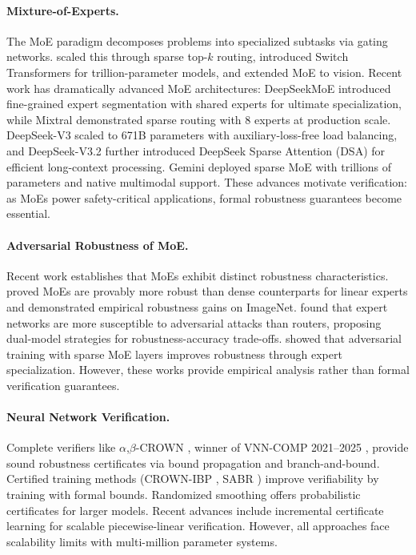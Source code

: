 \documentclass{article}
\theoremstyle{plain}
\theoremstyle{remark}
\begin{document}
\paragraph{Mixture-of-Experts.} The MoE paradigm \citep{jacobs1991} decomposes problems into specialized subtasks via gating networks. \citet{shazeer2017} scaled this through sparse top-$k$ routing, \citet{fedus2022} introduced Switch Transformers for trillion-parameter models, and \citet{riquelme2021} extended MoE to vision. Recent work has dramatically advanced MoE architectures: DeepSeekMoE \citep{dai2024} introduced fine-grained expert segmentation with shared experts for ultimate specialization, while Mixtral \citep{jiang2024} demonstrated sparse routing with 8 experts at production scale. DeepSeek-V3 \citep{deepseek2024} scaled to 671B parameters with auxiliary-loss-free load balancing, and DeepSeek-V3.2 \citep{deepseek2025v32} further introduced DeepSeek Sparse Attention (DSA) for efficient long-context processing. Gemini \citep{team2024gemini} deployed sparse MoE with trillions of parameters and native multimodal support. These advances motivate verification: as MoEs power safety-critical applications, formal robustness guarantees become essential.

\paragraph{Adversarial Robustness of MoE.} Recent work establishes that MoEs exhibit distinct robustness characteristics. \citet{puigcerver2022} proved MoEs are provably more robust than dense counterparts for linear experts and demonstrated empirical robustness gains on ImageNet. \citet{zhang2025moe} found that expert networks are more susceptible to adversarial attacks than routers, proposing dual-model strategies for robustness-accuracy trade-offs. \citet{pavlitska2025robust} showed that adversarial training with sparse MoE layers improves robustness through expert specialization. However, these works provide empirical analysis rather than formal verification guarantees.

\paragraph{Neural Network Verification.} Complete verifiers like $\alpha$,$\beta$-CROWN \citep{wang2021}, winner of VNN-COMP 2021--2025 \citep{brix2025}, provide sound robustness certificates via bound propagation and branch-and-bound. Certified training methods (CROWN-IBP \citep{zhang2020}, SABR \citep{mueller2023}) improve verifiability by training with formal bounds. Randomized smoothing \citep{cohen2019} offers probabilistic certificates for larger models. Recent advances include incremental certificate learning \citep{duong2025neuralsat} for scalable piecewise-linear verification. However, all approaches face scalability limits with multi-million parameter systems.
\end{document}
